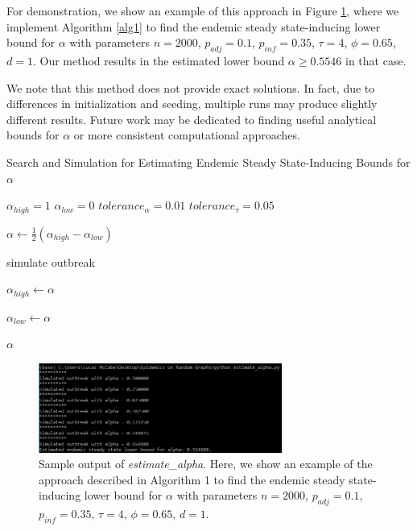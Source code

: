 \documentclass[psamsfonts]{amsart}
\theoremstyle{definition}
\theoremstyle{remark}
\numberwithin{equation}{section}
\begin{document}
For demonstration, we show an example of this approach in Figure \ref{fig1}, where we implement Algorithm \ref{alg1} to find the endemic steady state-inducing lower bound for $\alpha$ with parameters $n=2000$, $p_{adj} = 0.1$, $p_{inf}=0.35$, $\tau = 4$, $\phi = 0.65$, $d = 1$. Our method results in the estimated lower bound $\alpha \geq 0.5546$ in that case.

We note that this method does not provide exact solutions. In fact, due to differences in initialization and seeding, multiple runs may produce slightly different results. Future work may be dedicated to finding useful analytical bounds for $\alpha$ or more consistent computational approaches.

\begin{algorithm}
\caption{Search and Simulation for Estimating Endemic Steady State-Inducing Bounds for $\alpha$}\label{alg1}
\begin{algorithmic}

\State $\alpha_{high} = 1$
\State $\alpha_{low} = 0$
\State $tolerance_{\alpha} = 0.01$
\State $tolerance_{\tau} = 0.05$

    \State $\alpha \gets \frac{1}{2} (\alpha_{high}-\alpha_{low})$
    
    \State simulate outbreak
    
    
    \State $\alpha_{high} \gets \alpha$
    
    \Else \State $\alpha_{low} \gets \alpha$
    
    \EndIf
    
\EndWhile

\Return $\alpha$
\end{algorithmic}
\end{algorithm}

\begin{figure}
	\includegraphics[width=8cm]{estimate_alpha_example.PNG}
	\caption{Sample output of \textit{estimate\_alpha}. Here, we show an example of the approach described in Algorithm 1 to find the endemic steady state-inducing lower bound for $\alpha$ with parameters $n=2000$, $p_{adj} = 0.1$, $p_{inf}=0.35$, $\tau = 4$, $\phi = 0.65$, $d = 1$.  }
	\centering
	\label{fig1}
\end{figure}
\end{document}
